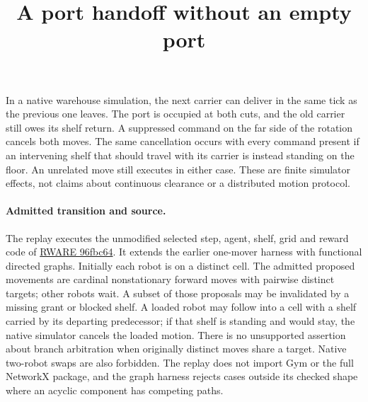 \documentclass[11pt]{article}
\title{A port handoff without an empty port}
\author{}
\date{}
\begin{document}
\maketitle

In a native warehouse simulation, the next carrier can deliver in the same tick as the previous one leaves. The port is occupied at both cuts, and the old carrier still owes its shelf return. A suppressed command on the far side of the rotation cancels both moves. The same cancellation occurs with every command present if an intervening shelf that should travel with its carrier is instead standing on the floor. An unrelated move still executes in either case. These are finite simulator effects, not claims about continuous clearance or a distributed motion protocol.

\paragraph{Admitted transition and source.}
The replay executes the unmodified selected step, agent, shelf, grid and reward code of \href{https://github.com/semitable/robotic-warehouse/blob/96fbc64e3eae5fee915e0d390f864fa06ddccd47/rware/warehouse.py}{RWARE 96fbc64}. It extends the earlier one-mover harness with functional directed graphs. Initially each robot is on a distinct cell. The admitted proposed movements are cardinal nonstationary forward moves with pairwise distinct targets; other robots wait. A subset of those proposals may be invalidated by a missing grant or blocked shelf. A loaded robot may follow into a cell with a shelf carried by its departing predecessor; if that shelf is standing and would stay, the native simulator cancels the loaded motion. There is no unsupported assertion about branch arbitration when originally distinct moves share a target. Native two-robot swaps are also forbidden. The replay does not import Gym or the full NetworkX package, and the graph harness rejects cases outside its checked shape where an acyclic component has competing paths.
\end{document}
